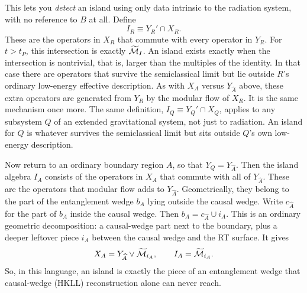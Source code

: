This lets you \emph{detect} an island using only data intrinsic to the radiation system, with no reference to
$B$ at all. Define
\[
I_R \equiv Y_R'\cap X_R .
\]
These are the operators in $X_R$ that commute with every operator in $Y_R$. For $t>t_P$, this intersection is
exactly $\widetilde{\mathcal{M}}_I$. An island exists exactly when the intersection is nontrivial, that is, larger than
the multiples of the identity. In that case there are operators that survive the semiclassical limit but lie
outside $R$'s ordinary low-energy effective description. As with $X_A$ versus $Y_{\widehat A}$ above, these
extra operators are generated from $Y_R$ by the modular flow of $X_R$. It is the same mechanism once more.
The same definition, $I_Q\equiv Y_Q'\cap X_Q$, applies to any subsystem $Q$ of an extended gravitational
system, not just to radiation. An island for $Q$ is whatever survives the semiclassical limit but sits outside
$Q$'s own low-energy description.

Now return to an ordinary boundary region $A$, so that $Y_Q=Y_{\widehat A}$. Then the island algebra $I_A$
consists of the operators in $X_A$ that commute with all of $Y_{\widehat A}$. These are the operators that
modular flow adds to $Y_{\widehat A}$. Geometrically, they belong to the part of the entanglement wedge $b_A$
lying outside the causal wedge. Write $c_{\widehat A}$ for the part of $b_A$ inside the causal wedge. Then
$b_A=c_{\widehat A}\cup i_A$. This is an ordinary geometric decomposition: a causal-wedge part next to the
boundary, plus a deeper leftover piece $i_A$ between the causal wedge and the RT surface. It gives
\[
X_A=Y_{\widehat A}\vee\widetilde{\mathcal{M}}_{i_A}, \qquad I_A=\widetilde{\mathcal{M}}_{i_A} .
\]
So, in this language, an island is exactly the piece of an entanglement wedge that causal-wedge (HKLL)
reconstruction alone can never reach.

